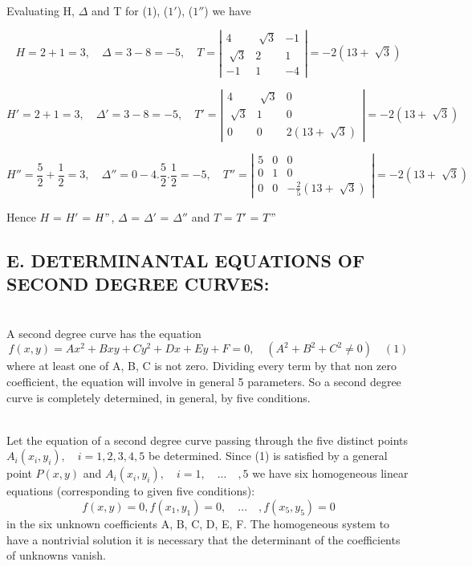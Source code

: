 \documentclass[11pt]{amsbook}
\begin{document}

    \\Evaluating H, $\Delta$ and T for ($1$), ($1'$), ($1''$) we have
    
    \[
    H= 2+1 = 3 ,\quad  \Delta = 3-8 = -5 , \quad
    T =  \left| \begin{array}{ccc}
        4 & \sqrt[]3 & -1 \\
        \sqrt[]3 & 2 & 1 \\
        -1 & 1 & -4 \end{array} \right|  = -2 (13 + \sqrt[]3)
    \] 

    \[
    H'= 2+1 = 3 ,\quad  \Delta ' = 3-8 = -5 , \quad
    T' =  \left| \begin{array}{ccc}
        4 & \sqrt[]3 & 0 \\
        \sqrt[]3 & 1 & 0 \\
        0 & 0 & 2(13+\sqrt[]3) \end{array} \right|  = -2 (13 + \sqrt[]3)
    \] 

    \[
    H''= \frac{5}{2}+ \frac{1}{2} = 3 ,\quad  \Delta '' = 0-4.\frac{5}{2} . \frac{1}{2} = -5 , \quad
    T'' =  \left| \begin{array}{ccc}
        5 & 0 & 0 \\
        0 & 1 & 0 \\
        0 & 0 & -\frac{2}{5}(13 + \sqrt[]3) \end{array} \right|  = -2 (13 + \sqrt[]3)
    \] 

    Hence $H$ = $H'$ = $H"$, $\Delta$ = $\Delta '$ = $\Delta ''$ and $T$ = $T'$ = $T"$



\subsection*{E. DETERMINANTAL EQUATIONS OF SECOND DEGREE CURVES:}

    \\A second degree curve has the equation
    \[
    f(x,y) = Ax^2 + Bxy + Cy^2 + Dx + Ey + F = 0, \quad (A^2 + B^2 + C^2 \neq 0) \quad (1)
    \]
    where at least one of A, B, C is not zero. Dividing every term by that non zero coefficient, the equation will involve in general 5 parameters. So a second degree curve is completely determined, in general, by five conditions.
    
    \\ Let the equation of a second degree curve passing through the five distinct points \(A_i(x_i , y_i), \quad i = 1 , 2, 3, 4 ,5\) be determined. Since (1) is satisfied by a general point \(P (x, y)\) and \(A_i(x_i , y_i), \quad i = 1 ,\quad ... \quad,5\) we have six homogeneous linear equations (corresponding to given five conditions):
    \[
    f (x, y) = 0, f(x_1, y_1) = 0, \quad ... \quad , f(x_5, y_5) = 0
    \] 
    in the six unknown coefficients A, B, C, D, E, F. The homogeneous system to have a nontrivial solution it is necessary that the determinant of the coefficients of unknowns vanish.

\end{document}
